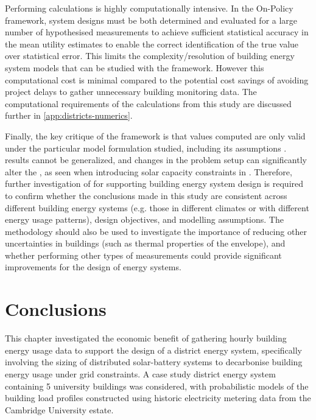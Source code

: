 Performing  calculations is highly computationally intensive. In the On-Policy  framework, system designs must be both determined and evaluated for a large number of hypothesised measurements to achieve sufficient statistical accuracy in the mean utility estimates to enable the correct identification of the true  value over statistical error. This limits the complexity/resolution of building energy system models that can be studied with the framework. However this computational cost is minimal compared to the potential cost savings of avoiding project delays to gather unnecessary building monitoring data. The computational requirements of the  calculations from this study are discussed further in \ref{app:districts-numerics}.

Finally, the key critique of the  framework is that  values computed are only valid under the particular model formulation studied, including its assumptions \citep{langtry2024RationalisingDataCollection}.  results cannot be generalized, and changes in the problem setup can significantly alter the , as seen when introducing solar capacity constraints in . Therefore, further investigation of  for supporting building energy system design is required to confirm whether the conclusions made in this study are consistent across different building energy systems (e.g. those in different climates or with different energy usage patterns), design objectives, and modelling assumptions. The  methodology should also be used to investigate the importance of reducing other uncertainties in buildings (such as thermal properties of the envelope), and whether performing other types of measurements could provide significant improvements for the design of energy systems.\\


\section{Conclusions} \label{sec:districts-conclusions}

This chapter investigated the economic benefit of gathering hourly building energy usage data to support the design of a district energy system, specifically involving the sizing of distributed solar-battery systems to decarbonise building energy usage under grid constraints. A case study district energy system containing 5 university buildings was considered, with probabilistic models of the building load profiles constructed using historic electricity metering data from the Cambridge University estate.

